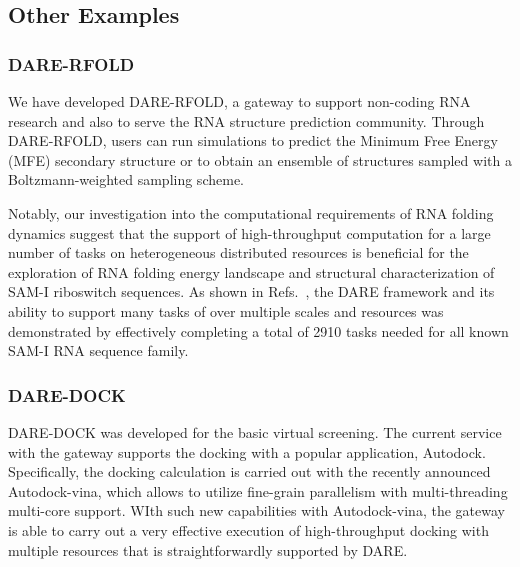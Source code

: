 \documentclass[]{svjour3}
\begin{document}
\subsection{Other Examples}
\subsubsection{DARE-RFOLD}

We have developed DARE-RFOLD, a gateway to support non-coding RNA
research and also to serve the RNA structure prediction
community. Through DARE-RFOLD, users can run simulations to predict
the Minimum Free Energy (MFE) secondary structure or to obtain an
ensemble of structures sampled with a Boltzmann-weighted sampling
scheme.


Notably, our investigation into the computational requirements of RNA
folding dynamics suggest that the support of high-throughput
computation for a large number of tasks on heterogeneous distributed
resources is beneficial for the exploration of RNA folding energy
landscape and structural characterization of SAM-I riboswitch
sequences. As shown in Refs.~\cite{dare-ecmls11,ccpe11}, the DARE
framework and its ability to support many tasks of over multiple
scales and resources was demonstrated by effectively completing a
total of 2910 tasks needed for all known SAM-I RNA sequence family.

\subsubsection{DARE-DOCK}
DARE-DOCK was developed for the basic virtual screening.  The current
service with the gateway supports the docking with a popular
application, Autodock\cite{autodock}. 
Specifically, the docking calculation is carried out with the recently
announced Autodock-vina, which allows to utilize fine-grain
parallelism with multi-threading multi-core support.  WIth such new
capabilities with Autodock-vina, the gateway is able to carry out a
very effective execution of high-throughput docking with multiple
resources that is straightforwardly supported by DARE.
\end{document}
